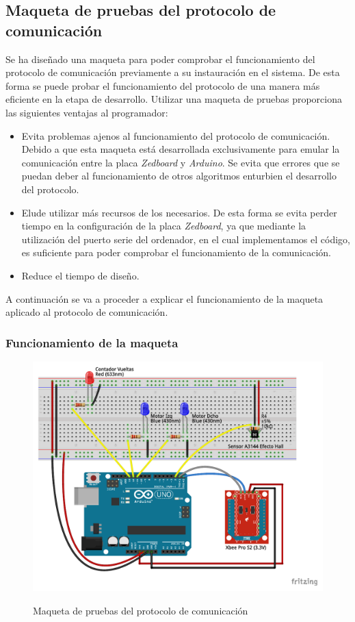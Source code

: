 \subsection{Maqueta de pruebas del protocolo de comunicación}\label{MaquetaPruebas}

Se ha diseñado una maqueta para poder comprobar el funcionamiento del protocolo de comunicación previamente a su instauración en el sistema. De esta forma se puede probar el funcionamiento del protocolo de una manera más eficiente en la etapa de desarrollo. Utilizar una maqueta de pruebas proporciona las siguientes ventajas al programador:

\begin{itemize}
\item Evita problemas ajenos al funcionamiento del protocolo de comunicación. Debido a que esta maqueta está desarrollada exclusivamente para emular la comunicación entre la placa \emph{Zedboard} y \emph{Arduino}. Se evita que errores que se puedan deber al funcionamiento de otros algoritmos enturbien el desarrollo del protocolo.
\item Elude utilizar más recursos de los necesarios. De esta forma se evita perder tiempo en la configuración de la placa \emph{Zedboard}, ya que mediante la utilización del puerto serie del ordenador, en el cual implementamos el código, es suficiente para poder comprobar el funcionamiento de la comunicación. 
\item Reduce el tiempo de diseño.
\end{itemize}

A continuación se va a proceder a explicar el funcionamiento de la maqueta aplicado al protocolo de comunicación.

\subsubsection{Funcionamiento de la maqueta}

\begin{figure}[hbtp]
\centering
	\includegraphics[width=.92\textwidth]{./figures/ProtocoloLEDS.pdf}
	\label{fig:ProtocoloLEDS}
	\caption{Maqueta de pruebas del protocolo de comunicación}
\end{figure}

